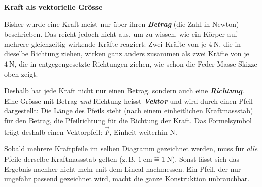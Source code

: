 \documentclass[addpoints,11pt,a4paper]{exam}
\newenvironment{theoriebox}[1][Theorie]{%
  \par\addvspace{10pt}\noindent\textbf{#1}\par\smallskip\noindent
}{%
  \par\addvspace{10pt}
}
\newcommand{\Massstab}[2]{\SI{#1}{\centi\meter}\mathrel{\hat=}\SI{#2}{\newton}}
\begin{document}
\begin{theoriebox}[Kraft als vektorielle Grösse]
Bisher wurde eine Kraft meist nur über ihren \textbf{\emph{Betrag}} (die
Zahl in Newton) beschrieben. Das reicht jedoch nicht aus, um zu wissen, wie
ein Körper auf mehrere gleichzeitig wirkende Kräfte reagiert: Zwei Kräfte
von je $\SI{4}{\newton}$, die in dieselbe Richtung ziehen, wirken ganz
anders zusammen als zwei Kräfte von je $\SI{4}{\newton}$, die in
entgegengesetzte Richtungen ziehen, wie schon die Feder-Masse-Skizze oben
zeigt.

Deshalb hat jede Kraft nicht nur einen Betrag, sondern auch eine
\textbf{\emph{Richtung}}. Eine Grösse mit Betrag \emph{und} Richtung heisst
\textbf{\emph{Vektor}} und wird durch einen Pfeil dargestellt: Die Länge des
Pfeils steht (nach einem einheitlichen Kraftmassstab) für den Betrag, die
Pfeilrichtung für die Richtung der Kraft. Das Formelsymbol trägt deshalb
einen Vektorpfeil: $\vec F$, Einheit weiterhin $\si{\newton}$.

\begin{hinweisbox}
Sobald mehrere Kraftpfeile im selben Diagramm gezeichnet werden, muss für
\emph{alle} Pfeile derselbe Kraftmassstab gelten (z.\,B. $\Massstab{1}{1}$).
Sonst lässt sich das Ergebnis nachher nicht mehr mit
dem Lineal nachmessen. Ein Pfeil, der nur \glqq ungefähr passend\grqq{}
gezeichnet wird, macht die ganze Konstruktion unbrauchbar.
\end{hinweisbox}
\end{theoriebox}
\end{document}

